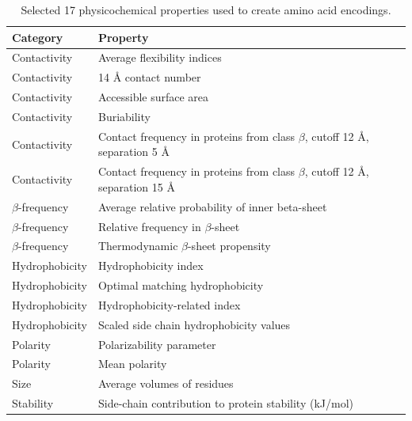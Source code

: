 \documentclass[fleqn,10pt,twoside]{gcb15submission}
\begin{document}
\begin{table}[bth]
\caption{Selected 17 physicochemical properties used to create amino acid encodings.} 
\label{tab:properties}
\small
\begin{tabularx}{\columnwidth}{@{} lX @{}}
  \toprule
  Category & Property \\ 
  \midrule
  Contactivity & Average flexibility indices \citep{bhaskaran_positional_1988} 
\\ 
  \rowcolor[gray]{0.85}Contactivity & 14 {\AA} contact number 
\citep{nishikawa_radial_1986} \\ 
  Contactivity & Accessible surface area \citep{radzicka_comparing_1988} \\ 
  \rowcolor[gray]{0.85}Contactivity & Buriability \citep{zhou_quantifying_2004} 
\\ 
  Contactivity & Contact frequency in proteins from class $\beta$, cutoff 
12 {\AA}, separation 5 {\AA} \citep{wozniak_characteristics_2014} \\ 
  \rowcolor[gray]{0.85}Contactivity & Contact frequency in proteins from class 
$\beta$, cutoff 12 {\AA}, separation 15 {\AA}
\citep{wozniak_characteristics_2014} \\ 
\hline 
  $\beta$-frequency & Average relative probability of inner \newline beta-sheet 
\citep{kanehisa_local_1980} \\ 
  \rowcolor[gray]{0.85}$\beta$-frequency & Relative frequency in $\beta$-sheet 
\citep{prabhakaran_distribution_1990} \\ 
  $\beta$-frequency & Thermodynamic $\beta$-sheet propensity 
\citep{kim_thermodynamic_1993} \\ 
\hline 
 \rowcolor[gray]{0.85} Hydrophobicity & Hydrophobicity index 
\citep{argos_structural_1982} \\ 
  Hydrophobicity & Optimal matching hydrophobicity 
\citep{sweet_correlation_1983} \\ 
  \rowcolor[gray]{0.85}Hydrophobicity & Hydrophobicity-related index 
\citep{kidera_statistical_1985} \\ 
  Hydrophobicity & Scaled side chain hydrophobicity values 
\citep{black_development_1991} \\ 
\hline 
  \rowcolor[gray]{0.85}Polarity & Polarizability parameter 
\citep{charton_structural_1982} \\
  Polarity & Mean polarity \citep{radzicka_comparing_1988} \\ 
  \hline 
  \rowcolor[gray]{0.85}Size & Average volumes of residues 
\citep{pontius_deviations_1996} \\ 
\hline 
  Stability & Side-chain contribution to protein stability (kJ/mol) 
\citep{takano_new_2001} \\
  \bottomrule
\end{tabularx}
\end{table}
\end{document}
